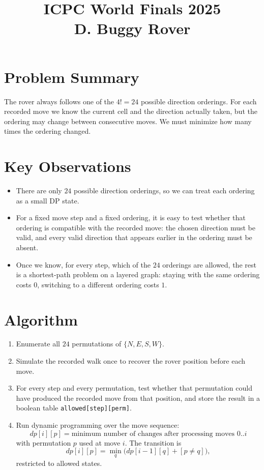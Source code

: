 \documentclass[11pt]{article}
\title{ICPC World Finals 2025\\D. Buggy Rover}
\author{}
\date{}
\begin{document}
\maketitle

\section*{Problem Summary}

The rover always follows one of the $4!=24$ possible direction orderings. For each recorded move we
know the current cell and the direction actually taken, but the ordering may change between consecutive
moves. We must minimize how many times the ordering changed.

\section*{Key Observations}

\begin{itemize}[leftmargin=*]
    \item There are only $24$ possible direction orderings, so we can treat each ordering as a small DP state.
    \item For a fixed move step and a fixed ordering, it is easy to test whether that ordering is compatible
    with the recorded move: the chosen direction must be valid, and every valid direction that appears
    earlier in the ordering must be absent.
    \item Once we know, for every step, which of the $24$ orderings are allowed, the rest is a shortest-path
    problem on a layered graph:
    staying with the same ordering costs $0$, switching to a different ordering costs $1$.
\end{itemize}

\section*{Algorithm}

\begin{enumerate}[leftmargin=*]
    \item Enumerate all $24$ permutations of $\{N,E,S,W\}$.
    \item Simulate the recorded walk once to recover the rover position before each move.
    \item For every step and every permutation, test whether that permutation could have produced the
    recorded move from that position, and store the result in a boolean table \texttt{allowed[step][perm]}.
    \item Run dynamic programming over the move sequence:
    \[
    dp[i][p] = \text{minimum number of changes after processing moves }0..i
    \]
    with permutation $p$ used at move $i$.
    The transition is
    \[
    dp[i][p] = \min_q \bigl(dp[i-1][q] + [p \ne q]\bigr),
    \]
    restricted to allowed states.
\end{enumerate}
\end{document}
